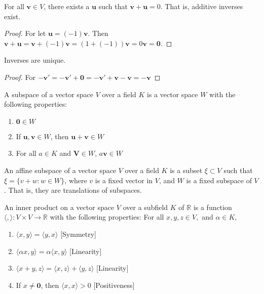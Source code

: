 \documentclass[crop=false,class=book,oneside]{standalone}
\begin{document}
            \begin{theorem}
            For all $\mathbf{v}\in V$, there exists a $\mathbf{u}$ such that $\mathbf{v}+\mathbf{u}=0$. That is, additive inverses exist.
            \end{theorem}
            \begin{proof}
            For let $\mathbf{u} = (-1)\mathbf{v}$. Then $\mathbf{v}+\mathbf{u} = \mathbf{v}+(-1)\mathbf{v} = (1+(-1))\mathbf{v} = 0\mathbf{v} = \mathbf{0}$.
            \end{proof}
            \begin{theorem}
            Inverses are unique.
            \end{theorem}
            \begin{proof}
            For $-\mathbf{v}'=-\mathbf{v}'+\mathbf{0}=-\mathbf{v}'+\mathbf{v}-\mathbf{v}=- \mathbf{v}$
            \end{proof}
            \begin{definition}
            A subspace of a vector space $V$ over a field $K$ is a vector space $W$ with the following properties:
            \begin{enumerate}
                \item $\mathbf{0} \in W$
                \item If $\mathbf{u,v}\in W$, then $\mathbf{u}+\mathbf{v} \in W$
                \item For all $a\in K$ and $\mathbf{V} \in W$, $a\mathbf{v} \in W$
            \end{enumerate}
            \end{definition}
            \begin{definition}
            An affine subspace of a vector space $V$ over a field $K$ is a subset $\xi\subset V$ such that $\xi = \{v+w:w\in W\}$, where $v$ is a fixed vector in $V$, and $W$ is a fixed subspace of $V$. That is, they are translations of subspaces.
            \end{definition}
            \begin{definition}
            An inner product on a vector space $V$ over a subfield $K$ of $\mathbb{R}$ is a function $\langle , \rangle:V\times V\rightarrow \mathbb{R}$ with the following properties: For all $x,y,z \in V,$ and $\alpha \in K$,
            \begin{enumerate}
                \item $\langle x,y \rangle = \langle y,x \rangle$ \hfill [Symmetry]
                \item $\langle \alpha x, y \rangle = \alpha \langle x,y \rangle$ \hfill [Linearity]
                \item $\langle x+y,z \rangle = \langle x,z\rangle + \langle y,z \rangle$ \hfill [Linearity]
                \item  If $x\ne \mathbf{0}$, then $\langle x,x\rangle >0$ \hfill [Positiveness]
            \end{enumerate}
            \end{definition}
\end{document}
